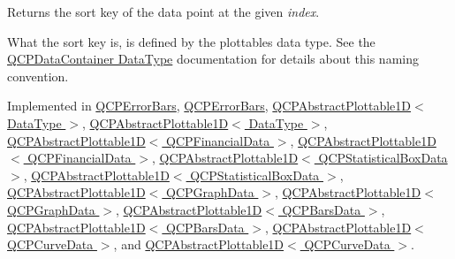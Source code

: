 Returns the sort key of the data point at the given {\itshape index}.

What the sort key is, is defined by the plottable\textquotesingle{}s data type. See the \hyperlink{class_q_c_p_data_container_qcpdatacontainer-datatype}{Q\+C\+P\+Data\+Container Data\+Type} documentation for details about this naming convention. 

Implemented in \hyperlink{class_q_c_p_error_bars_a1ef91328ad7dde84695958139d5f40cf}{Q\+C\+P\+Error\+Bars}, \hyperlink{class_q_c_p_error_bars_a31ba7d98d805617c41c7773ae2d2886b}{Q\+C\+P\+Error\+Bars}, \hyperlink{class_q_c_p_abstract_plottable1_d_a6fce4e684f33a31c45928899b5d9ab4b}{Q\+C\+P\+Abstract\+Plottable1\+D$<$ Data\+Type $>$}, \hyperlink{class_q_c_p_abstract_plottable1_d_aa044a82f3400b52f49e247d30ffb162d}{Q\+C\+P\+Abstract\+Plottable1\+D$<$ Data\+Type $>$}, \hyperlink{class_q_c_p_abstract_plottable1_d_a6fce4e684f33a31c45928899b5d9ab4b}{Q\+C\+P\+Abstract\+Plottable1\+D$<$ Q\+C\+P\+Financial\+Data $>$}, \hyperlink{class_q_c_p_abstract_plottable1_d_aa044a82f3400b52f49e247d30ffb162d}{Q\+C\+P\+Abstract\+Plottable1\+D$<$ Q\+C\+P\+Financial\+Data $>$}, \hyperlink{class_q_c_p_abstract_plottable1_d_a6fce4e684f33a31c45928899b5d9ab4b}{Q\+C\+P\+Abstract\+Plottable1\+D$<$ Q\+C\+P\+Statistical\+Box\+Data $>$}, \hyperlink{class_q_c_p_abstract_plottable1_d_aa044a82f3400b52f49e247d30ffb162d}{Q\+C\+P\+Abstract\+Plottable1\+D$<$ Q\+C\+P\+Statistical\+Box\+Data $>$}, \hyperlink{class_q_c_p_abstract_plottable1_d_a6fce4e684f33a31c45928899b5d9ab4b}{Q\+C\+P\+Abstract\+Plottable1\+D$<$ Q\+C\+P\+Graph\+Data $>$}, \hyperlink{class_q_c_p_abstract_plottable1_d_aa044a82f3400b52f49e247d30ffb162d}{Q\+C\+P\+Abstract\+Plottable1\+D$<$ Q\+C\+P\+Graph\+Data $>$}, \hyperlink{class_q_c_p_abstract_plottable1_d_a6fce4e684f33a31c45928899b5d9ab4b}{Q\+C\+P\+Abstract\+Plottable1\+D$<$ Q\+C\+P\+Bars\+Data $>$}, \hyperlink{class_q_c_p_abstract_plottable1_d_aa044a82f3400b52f49e247d30ffb162d}{Q\+C\+P\+Abstract\+Plottable1\+D$<$ Q\+C\+P\+Bars\+Data $>$}, \hyperlink{class_q_c_p_abstract_plottable1_d_a6fce4e684f33a31c45928899b5d9ab4b}{Q\+C\+P\+Abstract\+Plottable1\+D$<$ Q\+C\+P\+Curve\+Data $>$}, and \hyperlink{class_q_c_p_abstract_plottable1_d_aa044a82f3400b52f49e247d30ffb162d}{Q\+C\+P\+Abstract\+Plottable1\+D$<$ Q\+C\+P\+Curve\+Data $>$}.

\mbox{\label{class_q_c_p_plottable_interface1_d_a9ca7fcf14d885a200879768679b19be9}} 
